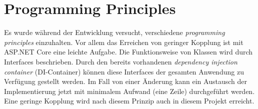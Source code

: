 \part{Programming Principles}
Es wurde während der Entwicklung versucht,
verschiedene \textit{programming principles} einzuhalten.
Vor allem das Erreichen von geringer Kopplung ist mit
ASP.NET Core eine leichte Aufgabe.
Die Funktionsweise von Klassen wird durch Interfaces beschrieben.
Durch den bereits vorhandenen \textit{dependency injection container} (DI-Container)
können diese Interfaces der gesamten Anwendung zu Verfügung gestellt werden.
Im Fall von einer Änderung kann ein Austausch der
Implementierung jetzt mit minimalem Aufwand (eine Zeile) durchgeführt werden.
Eine geringe Kopplung wird nach diesem Prinzip auch in diesem Projekt erreicht.